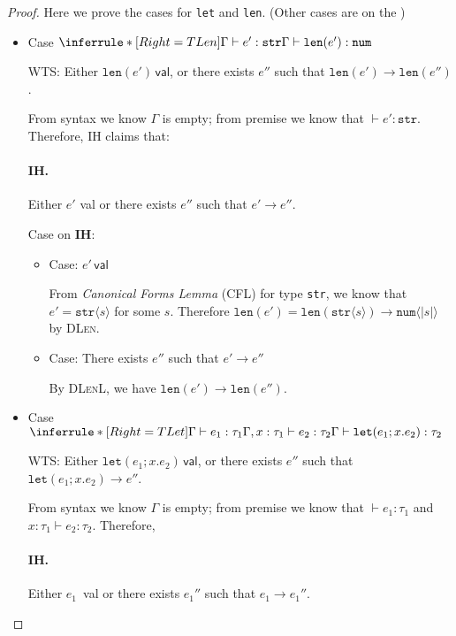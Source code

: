 \documentclass{article}
\theoremstyle{definition}
\newcommand{\ip}[1]{\langle #1 \rangle}
\begin{document}
\begin{proof}
    Here we prove the cases for \texttt{let} and \texttt{len}. (Other cases are on the \cite{int})
    \begin{itemize}
        \item Case $\inferrule*[Right=TLen]{\Gamma \vdash e':\mathtt{str}}{\Gamma \vdash \mathtt{len}(e') : \mathtt{num}}$

              WTS: Either $\mathtt{len}(e')\, \mathsf{val}$, or there exists $e''$ such that $\mathtt{len}(e') \longrightarrow \mathtt{len}(e'')$.

              From syntax we know $\Gamma$ is empty; from premise we know that $\vdash e': \mathtt{str}$. Therefore, IH claims that:
              \paragraph*{IH.} Either $e'$ \textsf{val} or there exists $e''$ such that $e' \longrightarrow e''$.

              Case on \textbf{IH}:
              \begin{itemize}
                  \item Case: $e'\, \mathsf{val}$

                        From \emph{Canonical Forms Lemma} (CFL) for type \texttt{str}, we know that $e' = \mathtt{str}\ip{s}$ for some $s$.
                        Therefore $\mathtt{len}(e') = \mathtt{len}(\mathtt{str}\ip{s}) \longrightarrow \mathtt{num}\ip{ |s| }$ by \textsc{DLen}.
                  \item Case: There exists $e''$ such that $e' \longrightarrow e''$

                        By \textsc{DLenL}, we have $\mathtt{len}(e')\longrightarrow \mathtt{len}(e'')$.
              \end{itemize}
        \item Case $\inferrule*[Right=TLet]{\Gamma \vdash e_1:\tau_1 \\ \Gamma,x:\tau_1 \vdash e_2:\tau_2}{\Gamma \vdash \mathtt{let}(e_1;x.e_2) : \tau_2}$

              WTS: Either $\mathtt{let}(e_1;x.e_2)\, \mathsf{val}$, or there exists $e''$ such that $\mathtt{let}(e_1;x.e_2) \longrightarrow e''$.

              From syntax we know $\Gamma$ is empty; from premise we know that $\vdash e_1:\tau_1$ and $x:\tau_1 \vdash e_2:\tau_2$. Therefore,
              \paragraph*{IH.} Either $e_1$\, \textsf{val} or there exists $e_1''$ such that $e_1 \longrightarrow e_1''$.


\end{itemize}
\end{proof}
\end{document}
